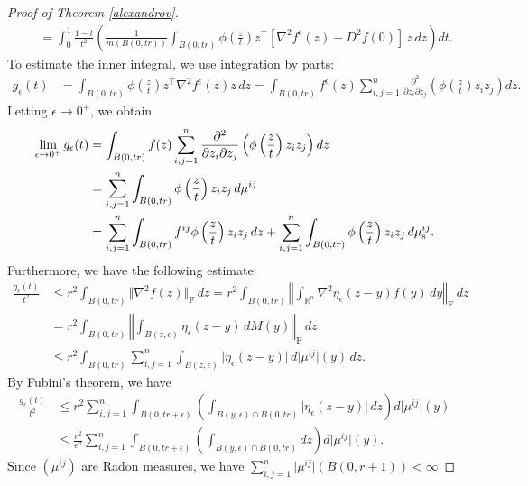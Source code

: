 \documentclass{article}
\numberwithin{equation}{section}
\newcommand{\bbR}{\mathbb{R}}
\theoremstyle{plain}
\theoremstyle{definition}
\begin{document}
\begin{proof}[Proof of Theorem \ref{alexandrov}]
\begin{align}
	&\quad=\int_0^1\frac{1-t}{t^2}\left(\frac{1}{m(B(0,tr))}\int_{B(0,tr)}\phi\left(\frac{z}{t}\right)z^\top[\nabla^2f^\epsilon(z)-D^2f(0)]\,z\,dz\right)dt.\tag{Change the vairable $z=ty$}
\end{align}
To estimate the inner integral, we use integration by parts:
\begin{align*}
	g_\epsilon(t)&=\int_{B(0,tr)}\phi\left(\frac{z}{t}\right)z^\top \nabla^2f^\epsilon(z)z\,dz=\int_{B(0,tr)}f^\epsilon(z)\sum_{i,j=1}^n\frac{\partial^2}{\partial z_i\partial z_j}\left(\phi\left(\frac{z}{t}\right)z_iz_j\right)dz.
\end{align*}
Letting $\epsilon\to 0^+$, we obtain
\begin{align}
	\begin{aligned}
	\lim_{\epsilon\to 0^+}g_\epsilon(t)&=\int_{B(0,tr)}f(z)\sum_{i,j=1}^n\frac{\partial^2}{\partial z_i\partial z_j}\left(\phi\left(\frac{z}{t}\right)z_iz_j\right)dz\\
	&=\sum_{i,j=1}^n\int_{B(0,tr)}\phi\left(\frac{z}{t}\right)z_iz_j\,d\mu^{ij}\\
	&=\sum_{i,j=1}^n\int_{B(0,tr)}f^{ij}\phi\left(\frac{z}{t}\right)z_iz_j\,dz+\sum_{i,j=1}^n\int_{B(0,tr)}\phi\left(\frac{z}{t}\right)z_iz_j\,d\mu^{ij}_{\rm s}.
\end{aligned}\label{convexgibpest}
\end{align}
Furthermore, we have the following estimate:
\begin{align*}
\frac{g_\epsilon(t)}{t^2}&\leq r^2\int_{B(0,tr)}\Vert\nabla^2f(z)\Vert_\mathrm{F}\,dz=r^2\int_{B(0,tr)}\left\Vert\int_{\bbR^n}\nabla^2\eta_\epsilon(z-y)f(y)\,dy\right\Vert_\mathrm{F}\,dz\\
&=r^2\int_{B(0,tr)}\left\Vert\int_{B(z,\epsilon)}\eta_\epsilon(z-y)\,dM(y)\right\Vert_\mathrm{F}\,dz\\
&\leq r^2\int_{B(0,tr)}\sum_{i,j=1}^n\int_{B(z,\epsilon)}\vert\eta_\epsilon(z-y)\vert\, d\vert\mu^{ij}\vert(y)\,dz.
\end{align*}
By Fubini's theorem, we have
\begin{align*}
\frac{g_\epsilon(t)}{t^2}&\leq r^2\sum_{i,j=1}^n\int_{B(0,tr+\epsilon)}\left(\int_{B(y,\epsilon)\cap B(0,tr)}\vert\eta_\epsilon(z-y)\vert\,dz\right)d\vert\mu^{ij}\vert(y)\\
&\leq\frac{r^2}{\epsilon^n}\sum_{i,j=1}^n\int_{B(0,tr+\epsilon)}\left(\int_{B(y,\epsilon)\cap B(0,tr)}dz\right)d\vert\mu^{ij}\vert(y).
\end{align*}
Since $(\mu^{ij})$ are Radon measures, we have $\sum_{i,j=1}^n\vert\mu^{ij}\vert(B(0,r+1))<\infty$

\end{proof}
\end{document}
